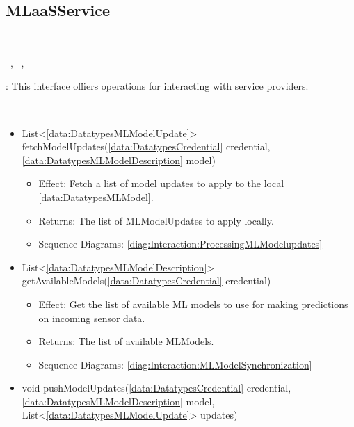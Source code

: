   \subsection{MLaaSService}\label{int:InterfacesMLaaSService}
    \begin{description}
      \item[Provided by:] \iconcomponent{}~
      \item[Required by:] \iconcomponent{}~, \iconcomponent{}~, \iconcomponent{}~ 
           \item[Description]: This interface offiers operations for interacting with  service providers.
      \item[Operations:] ~
    \begin{itemize}[noitemsep,nolistsep,leftmargin=-.25cm]
      \item \textsf{List\textless{}\ref{data:DatatypesMLModelUpdate}\textgreater{} fetchModelUpdates(\ref{data:DatatypesCredential} credential, \ref{data:DatatypesMLModelDescription} model)}
        \begin{itemize}[noitemsep,nolistsep]
           \item Effect: Fetch a list of model updates to apply to the local \ref{data:DatatypesMLModel}. 
           \item Returns: The list of MLModelUpdates to apply locally.
           \item Sequence Diagrams: \cref{diag:Interaction:ProcessingMLModelupdates}
        \end{itemize}
      \item \textsf{List\textless{}\ref{data:DatatypesMLModelDescription}\textgreater{} getAvailableModels(\ref{data:DatatypesCredential} credential)}
        \begin{itemize}[noitemsep,nolistsep]
           \item Effect: Get the list of available ML models to use for making predictions on incoming sensor data. 
           \item Returns: The list of available MLModels.
           \item Sequence Diagrams: \cref{diag:Interaction:MLModelSynchronization}
        \end{itemize}
      \item \textsf{void pushModelUpdates(\ref{data:DatatypesCredential} credential, \ref{data:DatatypesMLModelDescription} model, List\textless{}\ref{data:DatatypesMLModelUpdate}\textgreater{} updates)}

\end{itemize}
\end{description}
